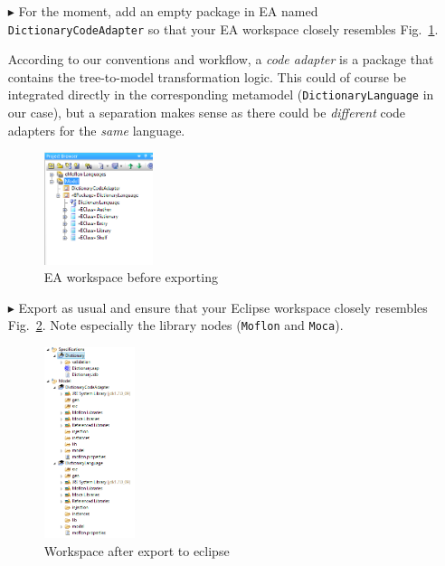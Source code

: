 \begin{enumerate}
\clearpage

\item[$\blacktriangleright$] For the moment, add an empty package in EA named \texttt{Dic\-tion\-ary\-Code\-Adapter} so that your EA workspace closely resembles Fig.~\ref{fig:moca-5-DictionaryMM-ProjectBrowser}.

According to our conventions and workflow, a \emph{code adapter} is a package that contains the tree-to-model transformation logic.
This could of course be integrated directly in the corresponding metamodel (\texttt{Dic\-tion\-ary\-Language} in our case), but a separation makes sense as there could be \emph{different} code adapters for the \emph{same} language.


\begin{figure}[!htbp]
\begin{center}
 \includegraphics[width=0.3\textwidth]{pics/moca/1DictionaryMetaModel/5-DictionaryMM-ProjectBrowser}
  \caption{EA workspace before exporting}
  \label{fig:moca-5-DictionaryMM-ProjectBrowser}
\end{center}
\end{figure}

\item[$\blacktriangleright$] Export as usual and ensure that your Eclipse workspace closely resembles Fig.~\ref{fig:moca-6-ExportToEclipse}.
Note especially the library nodes (\texttt{Moflon} and \texttt{Moca}).

\begin{figure}[!htbp]
\begin{center}
 \includegraphics[width=0.25\textwidth]{pics/moca/1DictionaryMetaModel/6-ExportToEclipse}
  \caption{Workspace after export to eclipse}
  \label{fig:moca-6-ExportToEclipse}
\end{center}
\end{figure}

\end{enumerate}